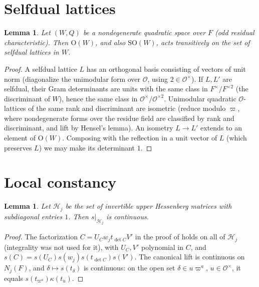 \documentclass[11pt,oneside,notitlepage]{book}
\numberwithin{equation}{section}
\theoremstyle{plain}
\newtheorem{lemma}[theorem]{Lemma}
\theoremstyle{definition}
\newcommand{\cO}{\mathcal{O}}
\newcommand{\SO}{\mathrm{SO}}
\newcommand{\Ort}{\mathrm{O}}
\begin{document}
\section{Selfdual lattices}

\begin{lemma}\label{lem:selfdual}
Let $(W,Q)$ be a nondegenerate quadratic space over $F$ (odd residual characteristic). Then $\Ort(W)$, and also $\SO(W)$, acts transitively on the set of selfdual lattices in $W$.
\end{lemma}
\begin{proof}
A selfdual lattice $L$ has an orthogonal basis consisting of vectors of unit norm (diagonalize the unimodular form over $\cO$, using $2\in\cO^\times$). If $L,L'$ are selfdual, their Gram determinants are units with the same class in $F^\times/F^{\times2}$ (the discriminant of $W$), hence the same class in $\cO^\times/\cO^{\times2}$. Unimodular quadratic $\cO$-lattices of the same rank and discriminant are isometric (reduce modulo $\varpi$, where nondegenerate forms over the residue field are classified by rank and discriminant, and lift by Hensel's lemma). An isometry $L\to L'$ extends to an element of $\Ort(W)$. Composing with the reflection in a unit vector of $L$ (which preserves $L$) we may make its determinant $1$.
\end{proof}

\section{Local constancy}

\begin{lemma}\label{lem:hess-continuous}
Let $\mathcal H_j$ be the set of invertible upper Hessenberg matrices with subdiagonal entries $1$. Then $s|_{\mathcal H_j}$ is continuous.
\end{lemma}
\begin{proof}
The factorization $C=U_Cw_jt_{\det C}V'$ in the proof of  holds on all of $\mathcal H_j$ (integrality was not used for it), with $U_C,V'$ polynomial in $C$, and $s(C)=s(U_C)s(w_j)s(t_{\det C})s(V')$. The canonical lift is continuous on $N_j(F)$, and $\delta\mapsto s(t_\delta)$ is continuous: on the open set $\delta\in u\varpi^a$, $u\in\cO^\times$, it equals $s(t_{\varpi^a})\kappa(t_u)$.
\end{proof}
\end{document}
